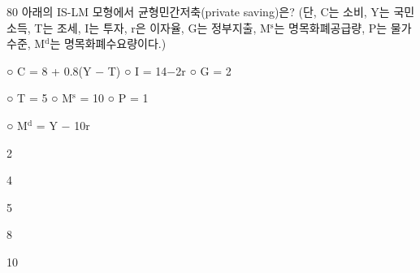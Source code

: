 \begin{question}{80}
아래의 IS-LM 모형에서 균형민간저축(private saving)은? (단, C는 소비, Y는 국민소득, T는 조세, I는 투자, r은 이자율, G는 정부지출, M$^{\mathrm{s}}$는 명목화폐공급량, P는 물가수준, M$^{\mathrm{d}}$는 명목화폐수요량이다.)
\begin{framedtext}
○ C = 8 + 0.8(Y $-$ T) \hfill ○ I = 14$-$2r \hfill ○ G = 2 \par
○ T = 5 \hspace{5.2em} ○ M$^{\mathrm{s}}$ = 10 \hfill ○ P = 1 \hfill\mbox{} \par
○ M$^{\mathrm{d}}$ = Y $-$ 10r
\end{framedtext}
\begin{choices}
  \item 2
  \item 4
  \item 5
  \item 8
  \item 10
\end{choices}
\end{question}
